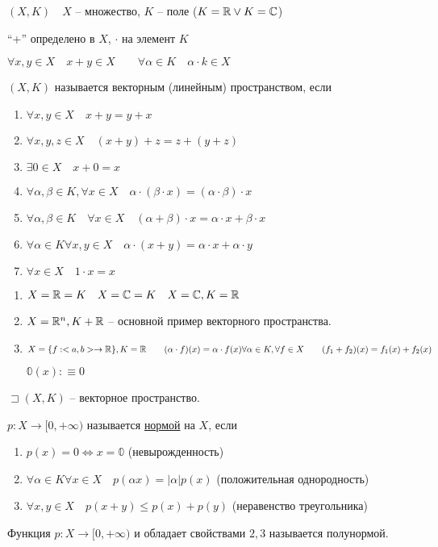     \begin{definition}
        $(X,K)\quad X$ -- множество, $K$ -- поле ($K = \mathbb{R}\lor K = \mathbb{C}$)

        ``+'' определено в $X$, $\cdot $ на элемент $K$

        $\forall x, y\in X\quad x+y\in X\qquad \forall \alpha \in K\quad \alpha\cdot k \in X$

        $(X,K)$ называется векторным (линейным) пространством, если
        \begin{enumerate}
            \item $\forall x, y\in X\quad x+y = y+x$
            \item $\forall x, y, z\in X\quad (x+y)+z = z + (y+z)$
            \item $\exists 0\in X\quad x+0=x$
            \item $\forall \alpha, \beta \in K, \forall x\in X\quad \alpha\cdot \left( \beta\cdot x \right)  = (\alpha\cdot \beta)\cdot x$
            \item $\forall \alpha, \beta\in K\quad \forall x\in X\quad (\alpha+\beta)\cdot x = \alpha\cdot x + \beta\cdot x$
            \item $\forall \alpha\in K\forall x, y\in X\quad \alpha\cdot (x+y) = \alpha\cdot x + \alpha\cdot y$
            \item $\forall x\in X\quad 1\cdot x = x$
        \end{enumerate}
    \end{definition}

    \begin{example}
        \begin{enumerate}
            \item $X=\mathbb{R}=K\quad X = \mathbb{C} = K\quad X=\mathbb{C}, K=\mathbb{R}$
            \item $X = \mathbb{R}^n, K+\mathbb{R}$ -- основной пример векторного пространства.
            \item $X = \{f:<a,b> \to \mathbb{R}\}, K = \mathbb{R}\qquad (\alpha\cdot f)(x) = \alpha\cdot f(x) \forall \alpha\in K, \forall f\in X\qquad (f_1+f_2)(x) = f_1(x) + f_2(x)$

                $\mathbb{0}(x):\equiv 0$
        \end{enumerate}
    \end{example}

    \begin{definition}
        $\sqsupset (X,K)$ -- векторное пространство.

        $p:X \to [0,+\infty )$ называется \underline{нормой} на $X$, если
        \begin{enumerate}
            \item $p(x) = 0 \iff  x = \mathbb{0}$ (невырожденность)
            \item $\forall \alpha\in K\forall x\in X\quad p(\alpha x) = \left| \alpha \right| p(x)$ (положительная однородность)
            \item $\forall x, y\in X\quad p(x+y)\leqslant p(x) + p(y)$ (неравенство треугольника)
        \end{enumerate}

        Функция $p:X\to [0,+\infty )$ и обладает свойствами $2, 3$ называется полунормой.
    \end{definition}

